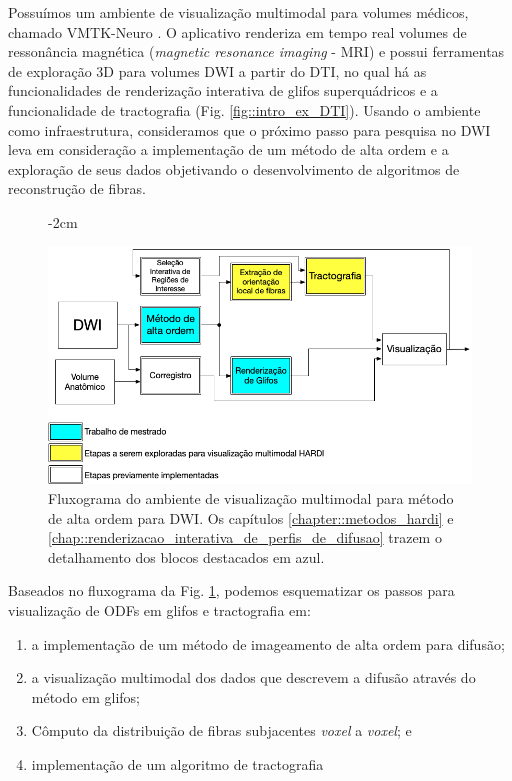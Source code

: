\documentclass[
    12pt,                %
    oneside,            %
    a4paper,            %
    english,            %
    french,                %
    spanish,            %
    brazil                %
    ]{abntex2}
\begin{document}
Possuímos um ambiente de visualização multimodal para volumes médicos, chamado VMTK-Neuro \cite{VMTKNeuro}. O aplicativo renderiza em tempo real volumes de ressonância magnética (\textit{magnetic resonance imaging} - MRI) e possui ferramentas de exploração 3D para volumes DWI a partir do DTI, no qual há as funcionalidades de renderização interativa de glifos superquádricos e a funcionalidade de tractografia (Fig. \ref{fig::intro_ex_DTI}). Usando o ambiente como infraestrutura, consideramos que o próximo passo para pesquisa no DWI leva em consideração a implementação de um método de alta ordem e a exploração de seus dados objetivando o desenvolvimento de algoritmos de reconstrução de fibras.

\begin{figure}[ht]
   \centering
       \addtolength{\leftskip} {-2cm} %
    \addtolength{\rightskip}{-2cm}

    \centering
    \includegraphics[width=.9\linewidth, angle=0]{figs/Introducao/fluxograma_VMTK_HARDI.png}
    \caption{Fluxograma do ambiente de visualização multimodal para método de alta ordem para DWI. Os capítulos \ref{chapter::metodos_hardi} e \ref{chap::renderizacao_interativa_de_perfis_de_difusao} trazem o detalhamento dos blocos destacados em azul.}
    \label{fig::flowchart_vmtk_hardi}
\end{figure}

Baseados no fluxograma da Fig. \ref{fig::flowchart_vmtk_hardi}, podemos esquematizar os passos para visualização de ODFs em glifos e tractografia em:

\begin{enumerate}
    \item a implementação de um método de imageamento de alta ordem para difusão;
    \item a visualização multimodal dos dados que descrevem a difusão através do método em glifos;
    \item Cômputo da distribuição de fibras subjacentes \textit{voxel} a \textit{voxel}; e
    \item implementação de um algoritmo de tractografia
\end{enumerate}
\end{document}
